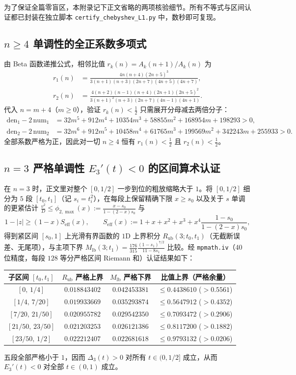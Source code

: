 \documentclass[UTF8,fontset=windows,a4paper,11pt]{ctexart}
\begin{document}
为了保证全篇零盲区，本附录记下正文省略的两项核验细节。所有不等式与区间认证都已封装在独立脚本 \texttt{certify\_chebyshev\_L1.py} 中，数秒即可复现。

\subsection{$n\ge 4$ 单调性的全正系数多项式}

由 Beta 函数递推公式，相邻比值 $r_k(n)=A_k(n+1)/A_k(n)$ 为
\begin{align*}
    r_1(n) &= \frac{4n(n+4)(2n+5)^3}{3(n+1)(n+3)(2n+7)(4n+5)(4n+7)},\\
    r_2(n) &= \frac{4(n+2)(n-1)(n+4)(2n+1)(2n+5)^2}{3(n+1)^2(n+3)(2n+7)(4n-1)(4n+1)}.
\end{align*}
代入 $n=m+4$（$m\ge 0$），验证 $r_k(n)<\frac12$ 只需展开分母减去两倍分子：
\begin{align*}
    \mathrm{den}_1-2\,\mathrm{num}_1 &= 32m^5+912m^4+10354m^3+58855m^2+168954m+198293 > 0,\\
    \mathrm{den}_2-2\,\mathrm{num}_2 &= 32m^6+912m^5+10458m^4+61765m^3+199569m^2+342243m+255933 > 0.
\end{align*}
全部系数严格为正，因此对一切 $n\ge 4$ 恒有 $r_1(n)<\frac12$ 且 $r_2(n)<\frac12$。

\subsection{$n=3$ 严格单调性 $E_3'(t)<0$ 的区间算术认证}

在 $n=3$ 时，正文里对整个 $[0,1/2]$ 一步到位的粗放缩略大于 $1$。将 $[0,1/2]$ 细分为 $5$ 段 $[t_0,t_1]$（记 $s_i=t_i^2$），在每段上保留精确下限 $x\ge s_0$ 以及关于 $s$ 单调的更紧估计 $\frac{v^2}{D}\le\phi_{2,\max}(x):=\frac{x-s_0}{1-(2-x)s_0}$ 与
\[
    1-|z| \ge (1-x)S_{\mathrm{eff}}(x),
    \qquad
    S_{\mathrm{eff}}(x) := 1+x+x^2+x^3+x^4\frac{1-s_0}{1-(2-x)s_0},
\]
得到紧区间 $[s_0,1]$ 上光滑有界函数的 $1\text{D}$ 上界积分 $R_{\mathrm{ub}}(3;t_0,t_1)$（无截断误差、无尾项），与主项下界 $M_{\mathrm{lb}}(3;t_1)=\frac{176}{315}\frac{(1-s_1)^{7/2}}{11-8s_1}$ 比较。经 \texttt{mpmath.iv}（40 位精度，每段 $128$ 等分严格区间 Riemann 和）认证结果如下：
\begin{center}
\begin{tabular}{cccc}
\toprule
子区间 $[t_0,t_1]$ & $R_{\mathrm{ub}}$ 严格上界 & $M_{\mathrm{lb}}$ 严格下界 & 比值上界（严格余量）\\
\midrule
$[0,\,1/4]$      & $0.018843402$ & $0.042453381$ & $\le 0.4438610$ ($>0.5561$)\\
$[1/4,\,7/20]$   & $0.019933669$ & $0.035293874$ & $\le 0.5647912$ ($>0.4352$)\\
$[7/20,\,21/50]$ & $0.020955782$ & $0.029542350$ & $\le 0.7093472$ ($>0.2906$)\\
$[21/50,\,23/50]$& $0.021203253$ & $0.026121386$ & $\le 0.8117200$ ($>0.1882$)\\
$[23/50,\,1/2]$  & $0.022212407$ & $0.022681618$ & $\le 0.9793132$ ($>0.0206$)\\
\bottomrule
\end{tabular}
\end{center}
五段全部严格小于 $1$，因而 $\Delta_3(t)>0$ 对所有 $t\in(0,1/2]$ 成立，从而 $E_3'(t)<0$ 对全部 $t\in(0,1)$ 成立。
\end{document}
